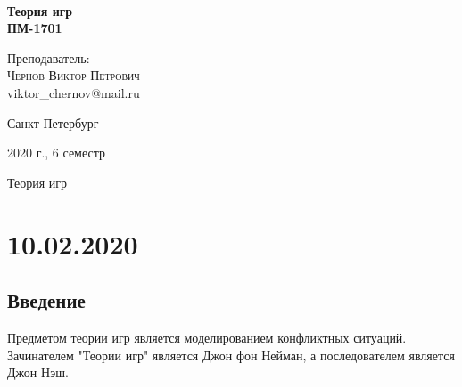\documentclass[aps,%
12pt,%
final,%
oneside,
onecolumn,%
musixtex, %
superscriptaddress,%
centertags]{article} %
\begin{document}
\begin{titlepage} 
\begin{center}
 
\textbf{}\\[10.0cm]
\textbf{\LARGE Теория игр}\\[0.5cm]
\textbf{\Large ПМ-1701} \\[0.1cm]

\begin{center} \large
{Преподаватель:} \\[0.5cm]
\textsc {Чернов Виктор Петрович}\\
{viktor\_chernov@mail.ru}\\
\end{center}
\vfill 

{\large {Санкт-Петербург}} \par
{\large {2020 г., 6 семестр}}
\end{center} 
\end{titlepage}

\begin{thebibliography}{3}
Теория игр
\end{thebibliography}
\tableofcontents
\newpage

\section{10.02.2020}
\subsection{Введение}

Предметом теории игр является моделированием конфликтных ситуаций. Зачинателем "Теории игр" является Джон фон Нейман, а последователем является Джон Нэш.
\end{document}
